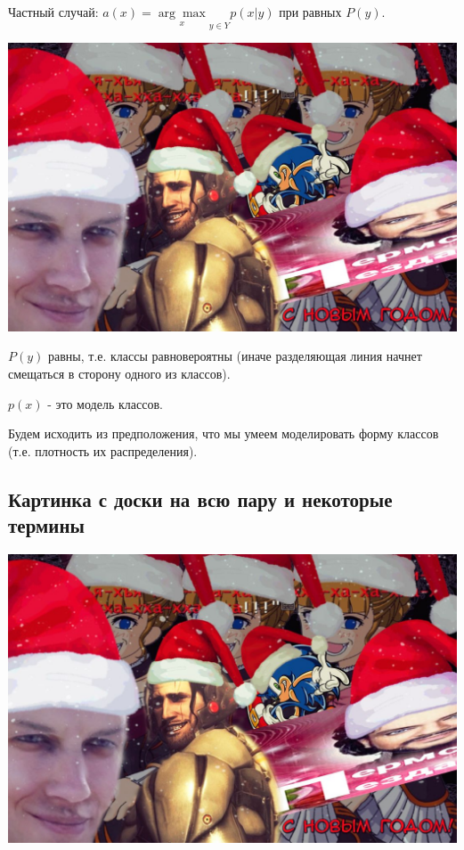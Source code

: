 Частный случай: $\displaystyle a{(x)} = {\underset{x}{\arg\max}}_{y \in Y}{p{(x \vert y)}}$
при равных $P{(y)}$.

\includegraphics[scale=0.3]{figures/samplefigure.jpg}

$P{(y)}$ равны, т.е. классы равновероятны (иначе разделяющая линия начнет
смещаться в сторону одного из классов).

$p{(x)}$ - это модель классов.

Будем исходить из предположения, что мы умеем моделировать форму классов
(т.е. плотность их распределения).

\subsection{Картинка с доски на всю пару и некоторые термины}

\includegraphics[scale=0.3]{figures/samplefigure.jpg}


